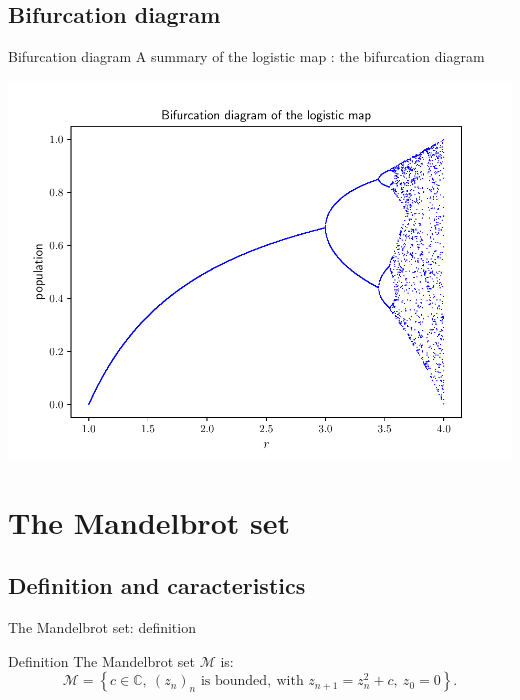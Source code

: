 \documentclass[11pt, compress]{beamer}
\theoremstyle{definition}
\begin{document}
\subsection{Bifurcation diagram}
\begin{frame}{Bifurcation diagram}
A summary of the logistic map : the bifurcation diagram
\begin{center}
    \includegraphics[scale=0.6]{bifurcation.pdf}
\end{center}
\end{frame}


\section[Mandelbrot]{The Mandelbrot set}
\subsection{Definition and caracteristics}
\begin{frame}{The Mandelbrot set: definition}

\begin{block}{Definition}
The Mandelbrot set $\mathcal{M}$ is:
$$\mathcal{M}=\left\{ c\in\mathbb{C},\ (z_n)_n \text{ is bounded},\ \text{with } z_{n+1}=z_n^2+c,\ z_0=0\right\}.$$
\end{block}

\end{frame}
\end{document}
